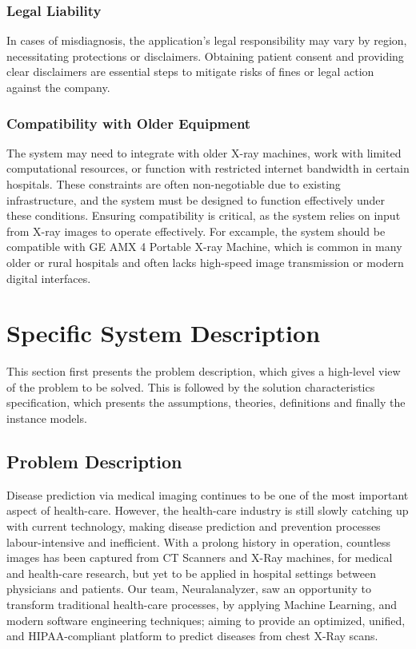 \documentclass[12pt]{article}
\begin{document}
\subsubsection{Legal Liability}
In cases of misdiagnosis, the application's legal responsibility may vary by region, necessitating protections or disclaimers. Obtaining patient consent and providing clear disclaimers are essential steps to mitigate risks of fines or legal action against the company.

\subsubsection{Compatibility with Older Equipment}
The system may need to integrate with older X-ray machines, work with limited computational resources, or function with restricted internet bandwidth in certain hospitals. These constraints are often non-negotiable due to existing infrastructure, and the system must be designed to function effectively under these conditions. Ensuring compatibility is critical, as the system relies on input from X-ray images to operate effectively. For excample, the system should be compatible with GE AMX 4 Portable X-ray Machine, which is common in many older or rural hospitals and often lacks high-speed image transmission or modern digital interfaces.


\section{Specific System Description}
This section first presents the problem description, which gives a high-level
view of the problem to be solved.  This is followed by the solution characteristics
specification, which presents the assumptions, theories, definitions and finally
the instance models.

\subsection{Problem Description}
Disease prediction via medical imaging continues to be one of the most important aspect of health-care. However, the health-care industry is still slowly catching up with current technology, making disease prediction and prevention processes labour-intensive and inefficient. With a prolong history in operation, countless images has been captured from CT Scanners and X-Ray machines, for medical and health-care research, but yet to be applied in hospital settings between physicians and patients.
\newline
Our team, Neuralanalyzer, saw an opportunity to transform traditional health-care processes, by applying Machine Learning, and modern software engineering techniques; aiming to provide an optimized, unified, and HIPAA-compliant platform to predict diseases from chest X-Ray scans.
\newpage
\end{document}
